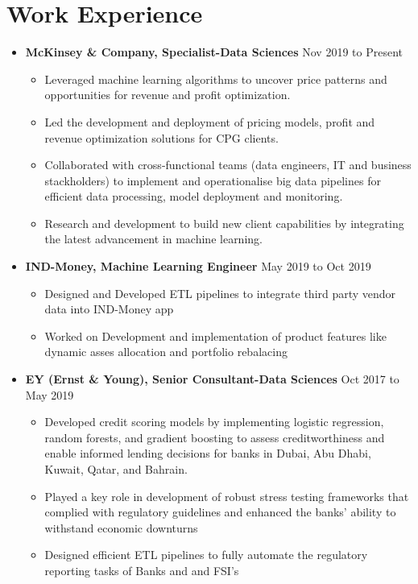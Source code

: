 \documentclass[a4paper,10pt]{article}
\begin{document}
\section*{Work Experience}
\begin{itemize}[leftmargin=0.2cm, label={}]
    \item \textbf{McKinsey \& Company, Specialist-Data Sciences} \hfill \textnormal{Nov 2019 to Present}
    \begin{itemize}[leftmargin=0.5cm, label={\textbullet}]
        \item Leveraged machine learning algorithms to uncover price patterns and opportunities for revenue and profit optimization.
        \item Led the development and deployment of pricing models, profit and revenue optimization solutions for CPG clients.
        \item Collaborated with cross-functional teams (data engineers, IT and business stackholders) to implement and operationalise big data pipelines for efficient data processing, model deployment and monitoring.
        \item Research and development to build new client capabilities by integrating the latest advancement in machine learning. 
    \end{itemize}
    
    \item \textbf{IND-Money, Machine Learning Engineer} \hfill \textnormal{May 2019 to Oct 2019}
    \begin{itemize}[leftmargin=0.5cm, label={\textbullet}]
        \item Designed and Developed ETL pipelines to integrate third party vendor data into IND-Money app
        \item Worked on Development and implementation of product features like dynamic asses allocation and portfolio rebalacing 
    \end{itemize}


    \item \textbf{EY (Ernst \& Young), Senior Consultant-Data Sciences} \hfill \textnormal{Oct 2017 to May 2019}
    \begin{itemize}[leftmargin=0.5cm, label={\textbullet}]
        \item Developed credit scoring models by implementing logistic regression, random forests, and gradient boosting to assess creditworthiness and enable informed lending decisions for banks in Dubai, Abu Dhabi, Kuwait, Qatar, and Bahrain.
        \item Played a key role in development of robust stress testing frameworks that complied with regulatory guidelines and enhanced the banks' ability to withstand economic downturns
        \item Designed efficient ETL pipelines to fully automate the regulatory reporting tasks of Banks and and FSI's
    \end{itemize}
    

\end{itemize}
\end{document}
